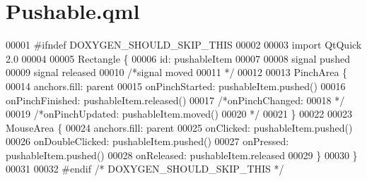 \hypertarget{Pushable_8qml}{\section{Pushable.\-qml}
\label{Pushable_8qml}
}

\begin{DoxyCode}
00001 \textcolor{preprocessor}{#ifndef DOXYGEN\_SHOULD\_SKIP\_THIS}
00002 \textcolor{preprocessor}{}
00003 \textcolor{keyword}{import} QtQuick 2.0
00004 
00005 Rectangle \{
00006     \textcolor{keywordtype}{id}: pushableItem
00007 
00008     signal pushed
00009     signal released
00010     \textcolor{comment}{/*signal moved}
00011 \textcolor{comment}{*/}
00012 
00013     PinchArea \{
00014         anchors.fill: parent
00015         onPinchStarted: pushableItem.pushed()
00016         onPinchFinished: pushableItem.released()
00017         \textcolor{comment}{/*onPinchChanged:}
00018 \textcolor{comment}{*/}
00019         \textcolor{comment}{/*onPinchUpdated: pushableItem.moved()}
00020 \textcolor{comment}{*/}
00021     \}
00022 
00023     MouseArea \{
00024         anchors.fill: parent
00025         onClicked: pushableItem.pushed()
00026         onDoubleClicked: pushableItem.pushed()
00027         onPressed: pushableItem.pushed()
00028         onReleased: pushableItem.released
00029     \}
00030 \}
00031 
00032 \textcolor{preprocessor}{#endif }\textcolor{comment}{/* DOXYGEN\_SHOULD\_SKIP\_THIS */}\textcolor{preprocessor}{}
\end{DoxyCode}
